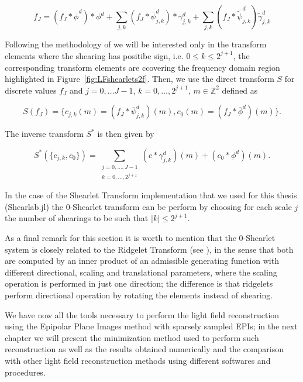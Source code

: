 $$
f_J=(f_J\ast \overline{\phi}^d)\ast \phi^d+\sum_{j,k}(f_J\ast\overline{\psi}^d_{j,k})\ast \gamma^d_{j,k}+\sum_{j,k}(f_J\ast \overline{\tilde{\psi}}^d_{j,k})\tilde{\gamma}^d_{j,k}
$$

Following the methodology of \cite{LF-Shearlets} we will be interested only in the transform elements where the shearing has positibe sign, i.e. $0\leq k\leq 2^{j+1}$, the corresponding transform elements are ccovering the frequency domain region highlighted in Figure~\ref{fig:LFshearlets2f}. Then, we use the direct transform $S$ for discrete values $f_J$ and $j=0,\ldots J-1$, $k=0,\ldots, 2^{j+1}$, $m\in\mathbb{Z}^2$ defined as 

$$
S(f_J)=\{ c_{j,k}(m)=(f_J\ast \overline{\psi}_{j,k}^d)(m),c_0(m)=(f_J\ast \overline{\phi}^d)(m)\}.
$$

The inverse transform $S^*$ is then given by

$$
S^*(\{c_{j,k},c_0\})=\sum_{\begin{matrix}j=0,\ldots,J-1\\k=0,\ldots,2^{j+1}\end{matrix}}(c\ast \gamma_{j,k}^d)(m)+(c_0\ast\phi^d)(m).
$$

In the case of the Shearlet Transform implementation that we used for this thesis (Shearlab.jl) the $0$-Shearlet transform can be perform by choosing for each scale $j$ the number of shearings to be such that $|k|\leq 2^{j+1}$.

\bigskip

As a final remark for this section it is worth to mention that the $0$-Shearlet system is closely related to the Ridgelet Transform (see \cite{ridglet}), in the sense that both are computed by an inner product of an admissible generating function with different directional, scaling and translational parameters, where the scaling operation is performed in just one direction; the difference is that ridgelets perform directional operation by rotating the elements instead of shearing.

\bigskip

We have now all the tools necessary to perform the light field reconstruction using the Epipolar Plane Images method with sparsely sampled EPIs; in the next chapter we will present the minimization method used to perform such reconstruction as well as the results obtained numerically and the comparison with other light field reconstruction methods using different softwares and procedures. 

